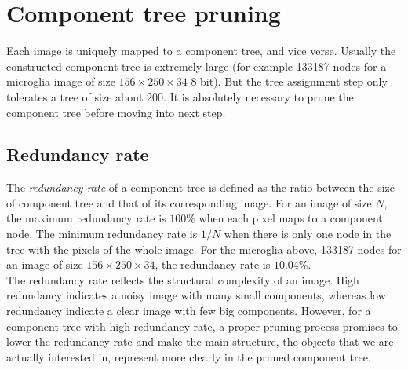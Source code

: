 \section{Component tree pruning}
Each image is uniquely mapped to a component tree, and vice verse. Usually the constructed component tree is extremely large (for example 133187 nodes for a microglia image of size $156\times250\times34$ 8 bit). But the tree assignment step only tolerates a tree of size about 200. It is absolutely necessary to prune the component tree before moving into next step.\\
\subsection{Redundancy rate}
The \emph{redundancy rate} of a component tree is defined as the ratio between the size of component tree and that of its corresponding image. For an image of size $N$, the maximum redundancy rate is $100\%$ when each pixel maps to a component node. The minimum redundancy rate is $1/N$ when there is only one node in the tree with the pixels of the whole image. For the microglia above, 133187 nodes for an image of size $156\times250\times34$, the redundancy rate is $10.04$\%.\\
The redundancy rate reflects the structural complexity of an image. High redundancy indicates a noisy image with many small components, whereas low redundancy indicate a clear image with few big components. However, for a component tree with high redundancy rate, a proper pruning process promises to lower the redundancy rate and make the main structure, the objects that we are actually interested in, represent more clearly in the pruned component tree.
